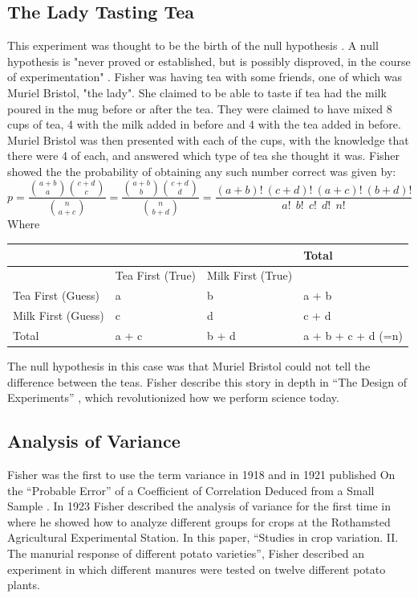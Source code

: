 \documentclass{article}
\begin{document}
\subsection{The Lady Tasting Tea}
This experiment was thought to be the birth of the null hypothesis \cite{salsburg_2002}.
A null hypothesis is "never proved or established, but is possibly disproved, in the course of experimentation" \cite{fisher:1935}.
Fisher was having tea with some friends, one of which was Muriel Bristol, "the lady".
She claimed to be able to taste if tea had the milk poured in the mug before or after the tea. 
They were claimed to have mixed 8 cups of tea, 4 with the milk added in before and 4 with the tea added in before.
Muriel Bristol was then presented with each of the cups, with the knowledge that there were 4 of each, and answered which type of tea she thought it was.
Fisher showed the the probability of obtaining any such number correct was given by:
$$
{\displaystyle p={\frac {\displaystyle {{a+b} \choose {a}}\displaystyle {{c+d} \choose {c}}}{\displaystyle {{n} \choose {a+c}}}}={\frac {\displaystyle {{a+b} \choose {b}}\displaystyle {{c+d} \choose {d}}}{\displaystyle {{n} \choose {b+d}}}}={\frac {(a+b)!~(c+d)!~(a+c)!~(b+d)!}{a!~~b!~~c!~~d!~~n!}}}
$$
Where 

\begin{table}[h!]
\centering
\begin{tabular}{@{}llll@{}}
\toprule
                   &                  &                   & Total              \\ \midrule
                   & Tea First (True) & Milk First (True) &                    \\
Tea First (Guess)  & a                & b                 & a + b              \\
Milk First (Guess) & c                & d                 & c + d              \\
Total              & a + c            & b + d             & a + b + c + d (=n) \\ \bottomrule
\end{tabular}
\end{table}


The null hypothesis in this case was that Muriel Bristol could not tell the difference between the teas.
Fisher describe this story in depth in ``The Design of Experiments'' \cite{fisher:1935}, which revolutionized how we perform science today.

\subsection{Analysis of Variance}
Fisher was the first to use the term variance in 1918 and in 1921 published On the ``Probable Error'' of a Coefficient of Correlation Deduced from a Small Sample \cite{Fisher1921}.
In 1923 Fisher described the analysis of variance for the first time in where he showed how to analyze different groups for crops at the Rothamsted Agricultural Experimental Station.
In this paper, ``Studies in crop variation. II. The manurial response of different potato varieties'', Fisher described an experiment in which different manures were tested on twelve different potato plants.
\end{document}
